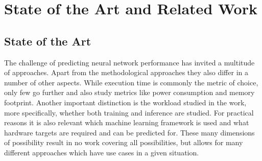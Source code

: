 \chapter{State of the Art and Related Work}\label{chap:sota}



\section{State of the Art}
The challenge of predicting neural network performance has invited a multitude of approaches.
Apart from the methodological approaches they also differ in a number of other aspects.
While execution time is commonly the metric of choice, only few go further and also study metrics
like power consumption and memory footprint. Another important distinction is the workload studied
in the work, more specifically, whether both training and inference are studied.
For practical reasons it is also relevant which machine learning framework is used and what hardware
targets are required and can be predicted for. These many dimensions of possibility result in no work
covering all possibilities, but allows for many different approaches which have use cases in a given
situation.

